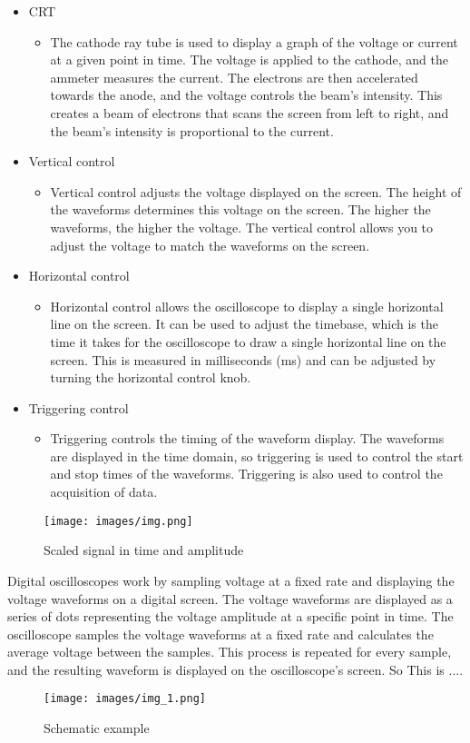 \begin{itemize}
	\item CRT
	\begin{itemize}
		\item The cathode ray tube is used to display a graph of the voltage or current at a given point in time. The voltage is applied to the cathode, and the ammeter measures the current. The electrons are then accelerated towards the anode, and the voltage controls the beam’s intensity. This creates a beam of electrons that scans the screen from left to right, and the beam’s intensity is proportional to the current.
	\end{itemize}
	\item Vertical control
	\begin{itemize}
		\item Vertical control adjusts the voltage displayed on the screen. The height of the waveforms determines this voltage on the screen. The higher the waveforms, the higher the voltage. The vertical control allows you to adjust the voltage to match the waveforms on the screen.
	\end{itemize}
	\item Horizontal control
	\begin{itemize}
		\item Horizontal control allows the oscilloscope to display a single horizontal line on the screen. It can be used to adjust the timebase, which is the time it takes for the oscilloscope to draw a single horizontal line on the screen. This is measured in milliseconds (ms) and can be adjusted by turning the horizontal control knob.
	\end{itemize}
	\item Triggering control
	\begin{itemize}
		\item Triggering controls the timing of the waveform display. The waveforms are displayed in the time domain, so triggering is used to control the start and stop times of the waveforms. Triggering is also used to control the acquisition of data.
	\end{itemize}
\end{itemize}

\begin{figure}[H]
	\centering
	\texttt{[image: images/img.png]}
	\caption{Scaled signal in time and amplitude}
	\label{fig:dunno}
\end{figure}

Digital oscilloscopes work by sampling voltage at a fixed rate and displaying the voltage waveforms on a digital screen. The voltage waveforms are displayed as a series of dots representing the voltage amplitude at a specific point in time. The oscilloscope samples the voltage waveforms at a fixed rate and calculates the average voltage between the samples. This process is repeated for every sample, and the resulting waveform is displayed on the oscilloscope’s screen. So This is ....

\begin{figure}[H]
	\centering
	\texttt{[image: images/img\_1.png]}
	\caption{Schematic example}
	\label{fig:dunno-vol-2}
\end{figure}


















